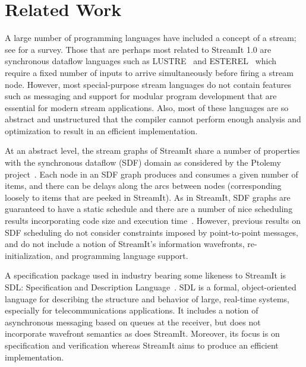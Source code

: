 \section{Related Work}
\label{sec:related}
A large number of programming languages have included a concept of a
stream; see \cite{survey97} for a survey.  Those that are perhaps most
related to StreamIt 1.0 are synchronous dataflow languages such as
LUSTRE~\cite{lustre} and ESTEREL~\cite{esterel92} which require a fixed
number of inputs to arrive simultaneously before firing a stream node.
However, most special-purpose stream languages do not contain features
such as messaging and support for modular program development that are
essential for modern stream applications.  Also, most of these languages
are so abstract and unstructured that the compiler cannot perform enough
analysis and optimization to result in an efficient implementation.

At an abstract level, the stream graphs of StreamIt share a number of
properties with the synchronous dataflow (SDF) domain as considered by
the Ptolemy project~\cite{ptolemyoverview}.  Each node in an SDF graph
produces and consumes a given number of items, and there can be delays
along the arcs between nodes (corresponding loosely to items that are
peeked in StreamIt).  As in StreamIt, SDF graphs are guaranteed to
have a static schedule and there are a number of nice scheduling
results incorporating code size and execution time~\cite{leesdf}.
However, previous results on SDF scheduling do not consider
constraints imposed by point-to-point messages, and do not include a
notion of StreamIt's information wavefronts, re-initialization, and
programming language support.

A specification package used in industry bearing some likeness to
StreamIt is SDL: Specification and Description Language~\cite{sdlrec}.
SDL is a formal, object-oriented language for describing the structure
and behavior of large, real-time systems, especially for
telecommunications applications.  It includes a notion of asynchronous
messaging based on queues at the receiver, but does not incorporate
wavefront semantics as does StreamIt.  Moreover, its focus is on
specification and verification whereas StreamIt aims to produce an
efficient implementation.

